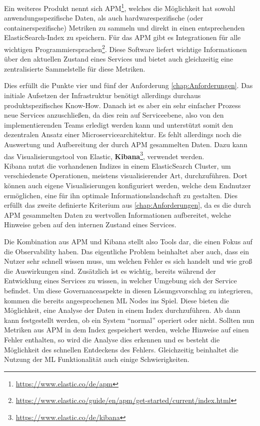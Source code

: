 \documentclass[
	12pt,
	BCOR=5mm,
	DIV=12,
	headinclude=on,
	footinclude=off,
	parskip=half,
	bibliography=totoc,
	listof=entryprefix,
	toc=listof,
	numbers=noenddot,
	plainfootsepline
]{scrreprt}
\begin{document}
Ein weiteres Produkt nennt sich \ac{APM}\footnote{\url{https://www.elastic.co/de/apm}}, welches die Möglichkeit hat sowohl anwendungsspezifische Daten, als auch hardwarespezifische (oder containerspezifische) Metriken zu sammeln und direkt in einen entsprechenden ElasticSearch-Index zu speichern. Für das \ac{APM} gibt es Integrationen für alle wichtigen Programmiersprachen\footnote{\url{https://www.elastic.co/guide/en/apm/get-started/current/index.html}}. Diese Software liefert wichtige Informationen über den aktuellen Zustand eines Services und bietet auch gleichzeitig eine zentralisierte Sammelstelle für diese Metriken. 

Dies erfüllt die Punkte vier und fünf der Anforderung \vref{chap:Anforderungen}. Das initiale Aufsetzen der Infrastruktur benötigt allerdings durchaus produktspezifisches Know-How. Danach ist es aber ein sehr einfacher Prozess neue Services anzuschließen, da dies rein auf Serviceebene, also von den implementierenden Teams erledigt werden kann und unterstützt somit den dezentralen Ansatz einer Microservicearchitektur. Es fehlt allerdings noch die Auswertung und Aufbereitung der durch \ac{APM} gesammelten Daten. Dazu kann das Visualisierungstool von Elastic, \textbf{Kibana}\footnote{\url{https://www.elastic.co/de/kibana}}, verwendet werden. \\
Kibana nutzt die vorhandenen Indizes in einem ElasticSearch Cluster, um verschiedenste Operationen, meistens visualisierender Art, durchzuführen. Dort können auch eigene Visualisierungen konfiguriert werden, welche dem Endnutzer ermöglichen, eine für ihn optimale Informationslandschaft zu gestalten. Dies erfüllt das zweite definierte Kriterium aus \vref{chap:Anforderungen}, da es die durch \ac{APM} gesammelten Daten zu wertvollen Informationen aufbereitet, welche Hinweise geben auf den internen Zustand eines Services.

Die Kombination aus \ac{APM} und Kibana stellt also Tools dar, die einen Fokus auf die Observability haben. Das eigentliche Problem beinhaltet aber auch, dass ein Nutzer sehr schnell wissen muss, um welchen Fehler es sich handelt und wie groß die Auswirkungen sind. Zusätzlich ist es wichtig, bereits während der Entwicklung eines Services zu wissen, in welcher Umgebung sich der Service befindet. Um diese Governanceaspekte in diesen Lösungsvorschlag zu integrieren, kommen die bereits angesprochenen \ac{ML} Nodes ins Spiel. Diese bieten die Möglichkeit, eine Analyse der Daten in einem Index durchzuführen. Ab dann kann festgestellt werden, ob ein System \enquote{normal} operiert oder nicht. Sollten nun Metriken aus \ac{APM} in dem Index gespeichert werden, welche Hinweise auf einen Fehler enthalten, so wird die Analyse dies erkennen und es besteht die Möglichkeit des schnellen Entdeckens des Fehlers. Gleichzeitig beinhaltet die Nutzung der \ac{ML} Funktionalität auch einige Schwierigkeiten.
\end{document}
